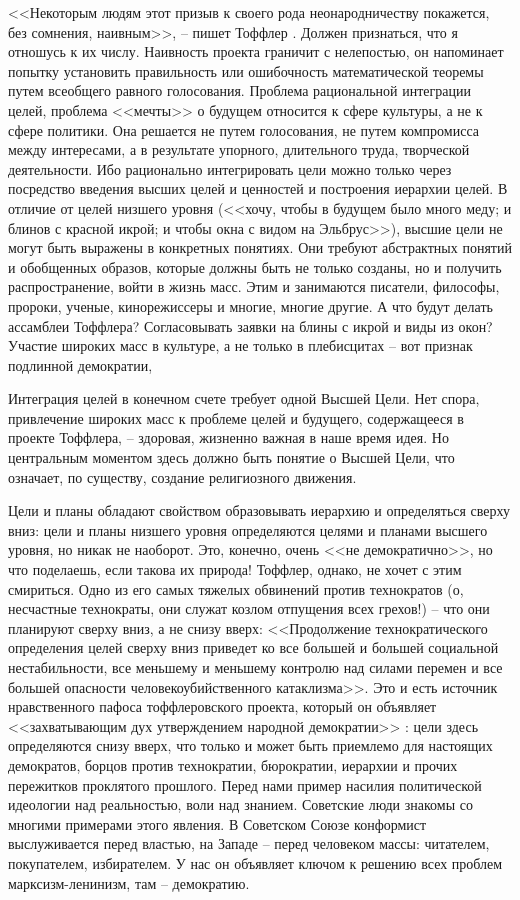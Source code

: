 \documentclass{book}
\begin{document}
<<Некоторым людям этот призыв к своего рода неонародни­честву покажется, без сомнения, наивным>>, -- пишет Тоф­флер%
.
Должен признаться, что я отношусь к их числу. Наив­ность проекта граничит с нелепостью, он напоминает попытку установить правильность или ошибочность математической те­оремы путем всеобщего равного голосования. Проблема раци­ональной интеграции целей, проблема <<мечты>> о будущем от­носится к сфере культуры, а не к сфере политики. Она решает­ся не путем голосования, не путем компромисса между инте­ресами, а в результате упорного, длительного труда, творче­ской деятельности. Ибо рационально интегрировать цели можно только через посредство введения высших целей и ценностей и построения иерархии целей. В отличие от целей низшего уров­ня (<<хочу, чтобы в будущем было много меду; и блинов с крас­ной икрой; и чтобы окна с видом на Эльбрус>>), высшие цели не могут быть выражены в конкретных понятиях. Они требуют абстрактных понятий и обобщенных образов, которые должны быть не только созданы, но 
и 
получить распространение, войти в жизнь масс. Этим и занимаются писатели, философы, пророки, ученые, кинорежиссеры и многие, многие другие. А что будут делать ассамблеи Тоффлера? Согласовывать заявки на блины с икрой и виды из окон? Участие широких масс в культуре, а не только в плебисцитах -- вот признак подлинной демокра­тии,

Интеграция целей в конечном счете требует одной Высшей Цели. Нет спора, привлечение широких масс к проблеме целей и будущего, содержащееся в проекте Тоффлера, -- здоровая, жизненно важная в наше время идея. Но центральным момен­том здесь должно быть понятие о Высшей Цели, что означает, по существу, создание религиозного движения.

Цели и планы обладают свойством образовывать иерархию и определяться сверху вниз: цели и планы низшего уровня определяются целями и планами высшего уровня, но никак не наоборот. Это, конечно, очень <<не демократично>>, но что поде­лаешь, если такова их природа! Тоффлер, однако, не хочет с этим смириться. Одно из его самых тяжелых обвинений против технократов (о, несчастные технократы, они служат козлом отпущения всех грехов!) -- что они планируют сверху вниз, а не снизу вверх: <<Продолжение технократического определения целей сверху вниз приведет ко все большей и большей социаль­ной нестабильности, все меньшему и меньшему контролю над си­лами перемен и все большей опасности человекоубийственного катаклизма>>.%
Это и есть источник нравственного пафоса тоффлеровского проекта, который он объявляет <<захватыва­ющим дух утверждением народной демократии>>%
:
цели здесь определяются снизу вверх, что только и может быть приемлемо для настоящих демократов, борцов против технократии, бю­рократии, иерархии и 
прочих 
пережитков проклятого прошлого. Перед нами пример насилия политической идеологии над реаль­ностью, воли над знанием. Советские люди знакомы со многи­ми примерами этого явления. В Советском Союзе конформист выслуживается перед властью, на Западе -- перед человеком мас­сы: читателем, покупателем, избирателем. У нас он объявляет ключом к решению всех проблем марксизм-ленинизм, там -- демократию.
\end{document}
